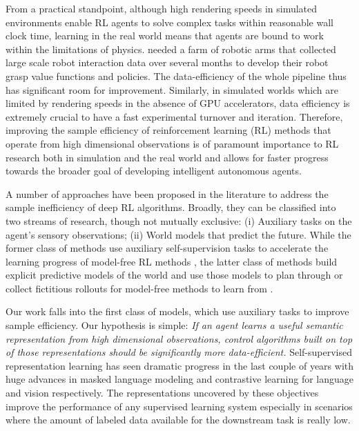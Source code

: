 From a practical standpoint, although high rendering speeds in simulated environments enable RL agents to solve complex tasks within reasonable wall clock time, learning in the real world means that agents are bound to work within the limitations of physics. \citet{kalashnikov2018qt} needed a farm of robotic arms that collected large scale robot interaction data over several months to develop their robot grasp value functions and policies. The data-efficiency of the whole pipeline thus has significant room for improvement. Similarly, in simulated worlds which are limited by rendering speeds in the absence of GPU accelerators, data efficiency is extremely crucial to have a fast experimental turnover and iteration. Therefore, improving the sample efficiency of reinforcement learning (RL) methods that operate from high dimensional observations is of paramount importance to RL research both in simulation and the real world and allows for faster progress towards the broader goal of developing intelligent autonomous agents.

A number of approaches have been proposed in the literature to address the sample inefficiency of deep RL algorithms. Broadly, they can be classified into two streams of research, though not mutually exclusive: (i) Auxiliary tasks on the agent's sensory observations; (ii) World models that predict the future. While the former class of methods use auxiliary self-supervision tasks to accelerate the learning progress of model-free RL methods \cite{jaderberg2016reinforcement, mirowski2016learning}, the latter class of methods build explicit predictive models of the world and use those models to plan through or collect fictitious rollouts for model-free methods to learn from \cite{sutton1990integrated, ha2018world, kaiser2019model, schrittwieser2019mastering}.


Our work falls into the first class of models, which use auxiliary tasks to improve sample efficiency. Our hypothesis is simple: {\it If an agent learns a useful semantic representation from high dimensional observations, control algorithms built on top of those representations should be significantly more data-efficient.} Self-supervised representation learning has seen dramatic progress in the last couple of years with huge advances in masked language modeling \cite{devlin2018bert} and contrastive learning \cite{henaff2019data, he2019momentum, chen2020simclr} for language and vision respectively. The representations uncovered by these objectives improve the performance of any supervised learning system especially in scenarios where the amount of labeled data available for the downstream task is really low. 


